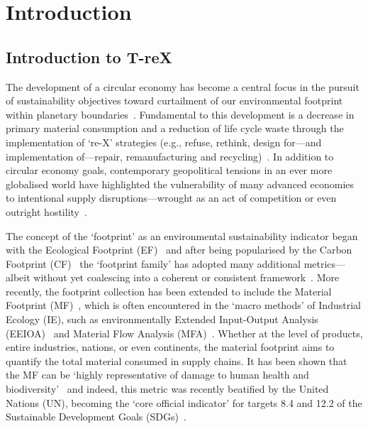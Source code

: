 \documentclass[a4paper,fleqn,longmktitle]{cas-dc}
\begin{document}

\section{Introduction}\label{sec:introduction}
\subsection{Introduction to T-reX}\label{sec:intro-trex}

The development of a circular economy has become a central focus in the pursuit of sustainability objectives toward curtailment of our environmental footprint within planetary boundaries~\citep{eu2019greendeal, eu2020circ,nl2023ceplan,nl2016ceplan,pardo2018ce,ellenmacarthur2015ce}. Fundamental to this development is a decrease in primary material consumption and a reduction of life cycle waste through the implementation of `re-X' strategies (e.g., refuse, rethink, design for---and implementation of---repair, remanufacturing and recycling)~\citep{reike2018rex, eu2022ecodesign, eu2022repair, eu2015reman}. In addition to circular economy goals, contemporary geopolitical tensions in an ever more globalised world have highlighted the vulnerability of many advanced economies to intentional supply disruptions---wrought as an act of competition or even outright hostility~\citep{jrc2023supplychain,hartley2024cepolitics,berry2023crm}.

The concept of the `footprint' as an environmental sustainability indicator began with the Ecological Footprint (EF)~\citep{wackernagel1994ecologicalfootprint} and after being popularised by the Carbon Footprint (CF)~\citep{cucek2015environmentalfootprints} the `footprint family' has adopted many additional metrics---albeit without yet coalescing into a coherent or consistent framework~\citep{giampietro2014footprintstonowhere, vanham2019footprints,ridoutt2013footprints}. More recently, the footprint collection has been extended to include the Material Footprint (MF)~\citep{weidmann2013materialfootprint}, which is often encountered in the `macro methods' of Industrial Ecology (IE), such as environmentally Extended Input-Output Analysis (EEIOA)~\citep{lenzen2022materialfootprint} and Material Flow Analysis (MFA)~\citep{schaffartzik2013mfafootprint}. Whether at the level of products, entire industries, nations, or even continents, the material footprint aims to quantify the total material consumed in supply chains. It has been shown that the MF can be `highly representative of damage to human health and biodiversity'~\citep{steinmann2017resourcefootprints} and indeed, this metric was recently beatified by the United Nations (UN), becoming the `core official indicator' for targets 8.4 and 12.2 of the Sustainable Development Goals (SDGs)~\citep{lenzen2022materialfootprint}.
\end{document}
